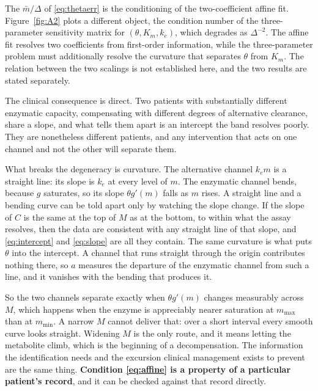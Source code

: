 \begin{remark}
\label{rem:two_scalings}
The $\bar m/\Delta$ of \eqref{eq:thetaerr} is the conditioning of the two-coefficient affine
fit. Figure~\ref{fig:A2} plots a different object, the condition number of the
three-parameter sensitivity matrix for $(\theta, K_m, k_e)$, which degrades as
$\Delta^{-2}$. The affine fit resolves two coefficients from first-order information, while
the three-parameter problem must additionally resolve the curvature that separates $\theta$
from $K_m$. The relation between the two scalings is not established here, and the two
results are stated separately.
\end{remark}

The clinical consequence is direct. Two patients with substantially different enzymatic
capacity, compensating with different degrees of alternative clearance, share a slope, and
what tells them apart is an intercept the band resolves poorly. They are nonetheless
different patients, and any intervention that acts on one channel and not the other will
separate them.

What breaks the degeneracy is curvature. The alternative
channel $k_e m$ is a straight line: its slope is $k_e$ at every level of $m$. The enzymatic
channel bends, because $g$ saturates, so its slope $\theta g'(m)$ falls as $m$ rises. A
straight line and a bending curve can be told apart only by watching the slope change. If
the slope of $C$ is the same at the top of $M$ as at the bottom, to within what the assay
resolves, then the data are consistent with any straight line of that slope, and
\eqref{eq:intercept} and \eqref{eq:slope} are all they contain. The same curvature is what
puts $\theta$ into the intercept. A channel that runs straight through the origin
contributes nothing there, so $a$ measures the departure of the enzymatic channel from such
a line, and it vanishes with the bending that produces it.

So the two channels separate exactly when $\theta g'(m)$ changes measurably across $M$,
which happens when the enzyme is appreciably nearer saturation at $m_{\max}$ than at
$m_{\min}$. A narrow $M$ cannot deliver that: over a short interval every smooth curve looks
straight. Widening $M$ is the only route, and it means letting the metabolite climb, which
is the beginning of a decompensation. The information the identification needs and the excursion clinical
management exists to prevent are the same thing. \textbf{Condition \eqref{eq:affine} is a
property of a particular patient's record}, and it can be checked against that record
directly.

